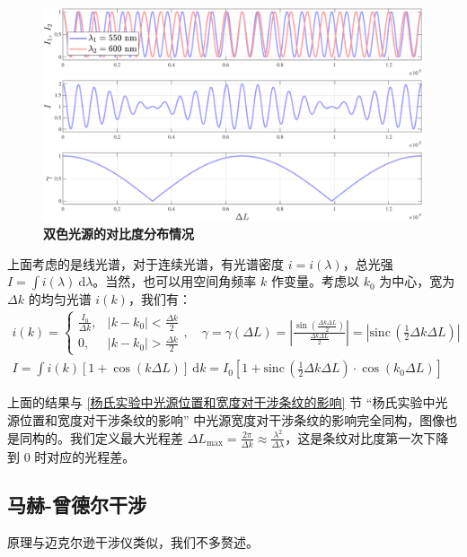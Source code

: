 \documentclass[UTF8]{report}
\def\sinc{\mathrm{sinc}\,}
\theoremstyle{MyLineTheoremStyle} %
\theoremstyle{MyBlockTheoremStyle} %
\theoremstyle{MySubsubsectionStyle} %
\begin{document}
\begin{figure}[H]\centering
\includegraphics[width=0.85\columnwidth]{assets/3/迈克尔逊干涉_双色光源.pdf}
\caption{\bfseries 双色光源的对比度分布情况}\label{双色光源的对比度分布情况}
\end{figure}

上面考虑的是线光谱，对于连续光谱，有光谱密度 $i = i(\lambda)$，总光强 $I = \int i(\lambda)\ \mathrm{d}\lambda$。当然，也可以用空间角频率 $k$ 作变量。考虑以 $k_0$ 为中心，宽为 $\Delta k$ 的均匀光谱 $i(k)$，我们有：
\begin{gather}\label{光谱宽度对对比度的影响}
i (k) = 
\begin{cases}
    \frac{I_0}{\Delta k}, & |k - k_0| < \frac{\Delta k}{2} \\
    0, & |k - k_0| > \frac{\Delta k}{2}
\end{cases} ,\quad \gamma = \gamma(\Delta L) = \left| \frac{\sin \left(\frac{\Delta k \Delta L}{2}\right)}{\frac{\Delta k \Delta L}{2}} \right| = \left| \sinc \left( \frac{1}{2}\Delta k \Delta L\right) \right| 
\\
I = \int i(k)\left[1 + \cos (k \Delta L)\right] \ \mathrm{d}k = I_0 \left[ 1 + \sinc \left( \frac{1}{2}\Delta k \Delta L\right) \cdot \cos (k_0 \Delta L)\right]
\end{gather}

上面的结果与 \ref{杨氏实验中光源位置和宽度对干涉条纹的影响} 节 “杨氏实验中光源位置和宽度对干涉条纹的影响” 中光源宽度对干涉条纹的影响完全同构，图像也是同构的。我们定义最大光程差 $\Delta L_{\max} = \frac{2 \pi}{\Delta k} \approx \frac{\lambda^2}{\Delta \lambda}$，这是条纹对比度第一次下降到 0 时对应的光程差。

\subsection{马赫-曾德尔干涉}

原理与迈克尔逊干涉仪类似，我们不多赘述。
\end{document}

